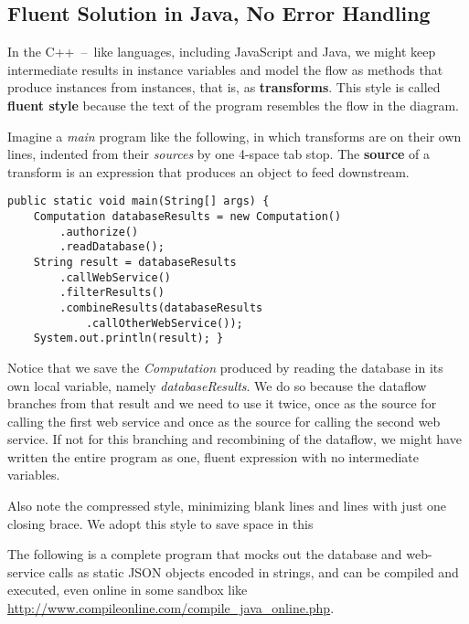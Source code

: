 \documentclass[11pt]{article}
\begin{document}
\subsection{Fluent Solution in Java, No Error Handling}
\label{sec-2-1}

In the \mbox{C++ -- like} languages, including JavaScript and Java,
we might keep intermediate results in instance variables and model
the flow as methods that produce instances from instances, that is,
as \textbf{transforms}. This style is called \textbf{fluent style}
because the text of the program resembles the flow in the diagram.

Imagine a \emph{main} program like the following, in which transforms are
on their own lines, indented from their \emph{sources} by one
\mbox{4-space} tab stop. The \textbf{source} of a transform is an
expression that produces an object to feed downstream.

\begin{verbatim}
public static void main(String[] args) {
    Computation databaseResults = new Computation()
        .authorize()
        .readDatabase();
    String result = databaseResults
        .callWebService()
        .filterResults()
        .combineResults(databaseResults
            .callOtherWebService());
    System.out.println(result); }
\end{verbatim}

Notice that we save the \emph{Computation} produced by reading the
database in its own local variable, namely \emph{databaseResults}. We do
so because the dataflow branches from that result and we need to
use it twice, once as the source for calling the first web service
and once as the source for calling the second web service. If not
for this branching and recombining of the dataflow, we might have
written the entire program as one, fluent expression with no
intermediate variables.

Also note the compressed style, minimizing blank lines and lines
with just one closing brace. We adopt this style to save space in
this 

The following is a complete program that mocks out the database and
web-service calls as static JSON objects encoded in strings, and can
be compiled and executed, even online in some sandbox like
\url{http://www.compileonline.com/compile_java_online.php}.
\end{document}
